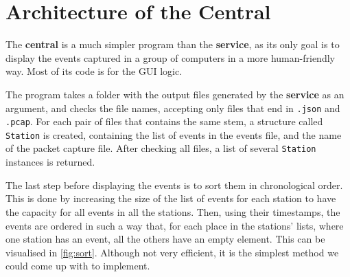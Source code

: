\section{Architecture of the Central}\label{sect:archcen}

The \textbf{central} is a much simpler program than the \textbf{service}, as its
only goal is to display the events captured in a group of computers in a more
human-friendly way. Most of its code is for the \ac{GUI} logic.

The program takes a folder with the output files generated by the
\textbf{service} as an argument, and checks the file names, accepting only files
that end in \texttt{.json} and \texttt{.pcap}. For each pair of files that
contains the same stem, a structure called \texttt{Station} is created,
containing the list of events in the events file, and the name of the packet
capture file. After checking all files, a list of several \texttt{Station}
instances is returned.

The last step before displaying the events is to sort them in chronological
order. This is done by increasing the size of the list of events for each
station to have the capacity for all events in all the stations. Then, using
their timestamps, the events are ordered in such a way that, for each place in
the stations' lists, where one station has an event, all the others have an
empty element. This can be visualised in \autoref{fig:sort}. Although not very
efficient, it is the simplest method we could come up with to implement.

